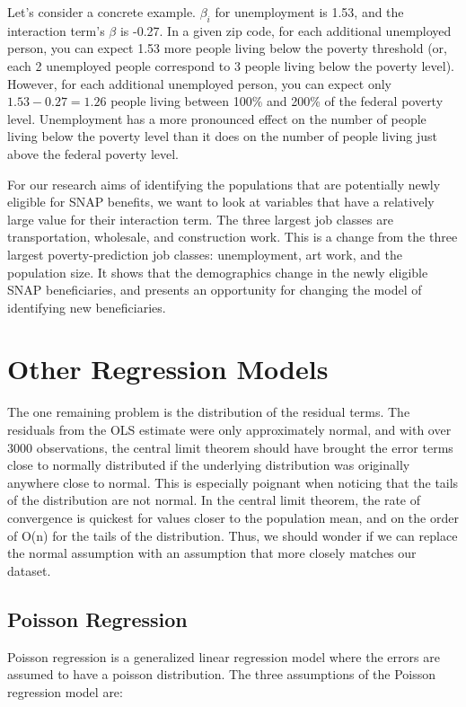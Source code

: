 Let's consider a concrete example. $\beta_i$ for unemployment is 1.53, and the interaction term's $\beta$ is -0.27. In a given zip code, for each additional unemployed person, you can expect 1.53 more people living below the poverty threshold (or, each 2 unemployed people correspond to 3 people living below the poverty level). However, for each additional unemployed person, you can expect only $1.53-0.27=\boxed{1.26}$ people living between 100\% and 200\% of the federal poverty level. Unemployment has a more pronounced effect on the number of people living below the poverty level than it does on the number of people living just above the federal poverty level.

For our research aims of identifying the populations that are potentially newly eligible for SNAP benefits, we want to look at variables that have a relatively large value for their interaction term. The three largest job classes are transportation, wholesale, and construction work. This is a change from the three largest poverty-prediction job classes: unemployment, art work, and the population size. It shows that the demographics change in the newly eligible SNAP beneficiaries, and presents an opportunity for changing the model of identifying new beneficiaries. 


\section{Other Regression Models}

The one remaining problem is the distribution of the residual terms. The residuals from the OLS estimate were only approximately normal, and with over 3000 observations, the central limit theorem should have brought the error terms close to normally distributed if the underlying distribution was originally anywhere close to normal. This is especially poignant when noticing that the tails of the distribution are not normal. In the central limit theorem, the rate of convergence is quickest for values closer to the population mean, and on the order of O(n) for the tails of the distribution. Thus, we should wonder if we can replace the normal assumption with an assumption that more closely matches our dataset. 


\subsection{Poisson Regression}
\label{sec:poisson}

Poisson regression is a generalized linear regression model where the errors are assumed to have a poisson distribution. The three assumptions of the Poisson regression model are:

